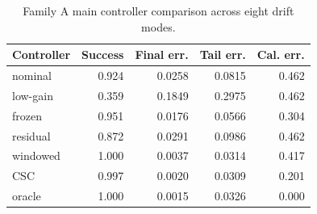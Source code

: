 \begin{table}[t]
\caption{Family A main controller comparison across eight drift modes.}
\label{tab:main-controller}
\centering
\begin{tabular}{lrrrr}
\toprule
Controller & Success & Final err. & Tail err. & Cal. err. \\
\midrule
nominal & 0.924 & 0.0258 & 0.0815 & 0.462 \\
low-gain & 0.359 & 0.1849 & 0.2975 & 0.462 \\
frozen & 0.951 & 0.0176 & 0.0566 & 0.304 \\
residual & 0.872 & 0.0291 & 0.0986 & 0.462 \\
windowed & 1.000 & 0.0037 & 0.0314 & 0.417 \\
CSC & 0.997 & 0.0020 & 0.0309 & 0.201 \\
oracle & 1.000 & 0.0015 & 0.0326 & 0.000 \\
\bottomrule
\end{tabular}
\end{table}
